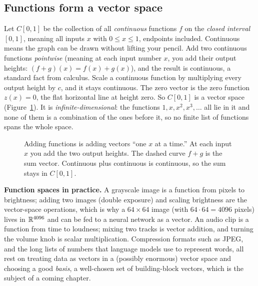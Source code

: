 \subsection{Functions form a vector space}

Let $C[0,1]$ be the collection of all
\emph{continuous} functions $f$ on the \emph{closed interval} $[0,1]$, meaning all inputs
$x$ with $0\le x\le 1$, endpoints included. Continuous means the graph can be
drawn without lifting your pencil. Add two continuous functions \emph{pointwise} (meaning
at each input number $x$, you add their output heights: $(f+g)(x) = f(x)+g(x)$), and the
result is continuous, a standard fact from calculus. Scale a continuous function by
multiplying every output height by $c$, and it stays continuous. The zero vector is the
zero function $z(x) = 0$, the flat horizontal line at height zero. So $C[0,1]$ is a vector
space (Figure~\ref{ch11:fig-funcadd}). It is \emph{infinite-dimensional}: the functions
$1, x, x^2, x^3, \dots$ all lie in it and none of them is a combination of the ones before
it, so no finite list of functions spans the whole space.

\begin{figure}[htbp]
\centering
{}
\caption{Adding functions is adding vectors ``one $x$ at a time.'' At each input $x$ you
add the two output heights. The dashed curve $f+g$ is the sum vector. Continuous plus
continuous is continuous, so the sum stays in $C[0,1]$.}
\label{ch11:fig-funcadd}
\end{figure}

\begin{applicationbox}
\textbf{Function spaces in practice.} A grayscale image is a function from
pixels to brightness; adding two images (double exposure) and scaling brightness are
the vector-space operations, which is why a $64\times 64$ image (with $64\cdot 64=4096$
pixels) lives in $\mathbb{R}^{4096}$ and can be fed to a neural network as a vector. An audio clip
is a function from time to loudness; mixing two tracks is vector addition, and turning the
volume knob is scalar multiplication. Compression formats such as JPEG, and the long lists
of numbers that language models use to represent words, all rest on treating data as
vectors in a (possibly enormous) vector space and choosing a good \emph{basis}, a
well-chosen set of building-block vectors, which is the subject of a coming chapter.
\end{applicationbox}

